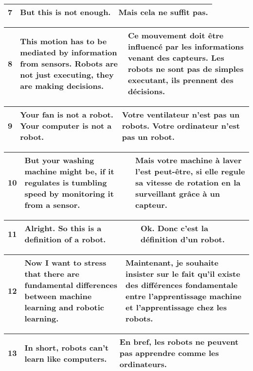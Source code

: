 \documentclass{article}
\begin{document}
\begin{tabular}{ | p{1cm} | p{8cm} | p{8cm} |}
\hline
7 & But this is not enough.
 & Mais cela ne suffit pas.
 \\ 
\hline
\end{tabular}

\begin{tabular}{ | p{1cm} | p{8cm} | p{8cm} |}
\hline
8 & This motion has to be mediated by information from sensors. Robots are not just executing, they are making decisions.
 & Ce mouvement doit être influencé par les informations venant des capteurs. Les robots ne sont pas de simples executant, ils prennent des décisions.
 \\ 
\hline
\end{tabular}

\begin{tabular}{ | p{1cm} | p{8cm} | p{8cm} |}
\hline
9 & Your fan is not a robot. Your computer is not a robot.
 & Votre ventilateur n'est pas un robots. Votre ordinateur n'est pas un robot.
 \\ 
\hline
\end{tabular}

\begin{tabular}{ | p{1cm} | p{8cm} | p{8cm} |}
\hline
10 & But your washing machine might be, if it regulates is tumbling speed by monitoring it from a sensor.
 & Mais votre machine à laver l'est peut-être, si elle regule sa vitesse de rotation en la surveillant grâce à un capteur.
 \\ 
\hline
\end{tabular}

\begin{tabular}{ | p{1cm} | p{8cm} | p{8cm} |}
\hline
11 & Alright. So this is a definition of a robot.
 & Ok. Donc c'est la définition d'un robot.
 \\ 
\hline
\end{tabular}

\begin{tabular}{ | p{1cm} | p{8cm} | p{8cm} |}
\hline
12 & Now I want to stress that there are fundamental differences between machine learning and robotic learning.
 & Maintenant, je souhaite insister sur le fait qu'il existe des différences fondamentale entre l'apprentissage machine et l'apprentissage chez les robots.
 \\ 
\hline
\end{tabular}

\begin{tabular}{ | p{1cm} | p{8cm} | p{8cm} |}
\hline
13 & In short, robots can't learn like computers.
 & En bref, les robots ne peuvent pas apprendre comme les ordinateurs.
 \\ 
\hline
\end{tabular}
\end{document}
